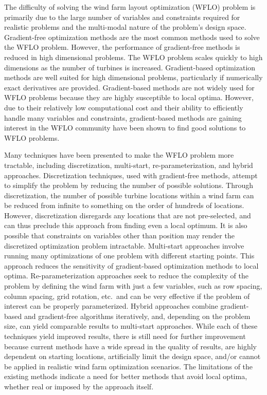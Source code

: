 \documentclass[hidelinks,sort&compress,AMA,STIX1COL]{WileyNJD-v2}
\begin{document}
The difficulty of solving the wind farm layout optimization (WFLO) problem is primarily due to the large number of variables and constraints required for realistic problems and the multi-modal nature of the problem's design space. Gradient-free optimization methods are the most common methods used to solve the WFLO problem. However, the performance of gradient-free methods is reduced in high dimensional problems\cite{rios2013-grad-free-comparison}. The WFLO problem scales quickly to high dimensions as the number of turbines is increased. Gradient-based optimization methods are well suited for high dimensional problems, particularly if numerically exact derivatives are provided. Gradient-based methods are not widely used for WFLO problems because they are highly susceptible to local optima\cite{acero2014}. However, due to their relatively low computational cost and their ability to efficiently handle many variables and constraints, gradient-based methods are gaining interest in the WFLO community have been shown to find good solutions to WFLO problems\cite{fleming2015,guirguis2016,gebraad2017-Maximization-Annual,baker2019,thomas2019-les-validation}.  

Many techniques have been presented to make the WFLO problem more tractable, including discretization, multi-start, re-parameterization, and hybrid approaches. Discretization techniques, used with gradient-free methods, attempt to simplify the problem by reducing the number of possible solutions\cite{mosetti1994, grady2005}. Through discretization, the number of possible turbine locations within a wind farm can be reduced from infinite to something on the order of hundreds of locations. However, discretization disregards any locations that are not pre-selected, and can thus preclude this approach from finding even a local optimum. It is also possible that constraints on variables other than position may render the discretized optimization problem intractable. Multi-start approaches involve running many optimizations of one problem with different starting points\cite{gonzalez2014,stanley2019-hub-height,thomas2018-wec,thomas2019-les-validation}. This approach reduces the sensitivity of gradient-based optimization methods to local optima. Re-parameterization approaches seek to reduce the complexity of the problem by defining the wind farm with just a few variables, such as row spacing, column spacing, grid rotation, etc.~and can be very effective if the problem of interest can be properly parameterized\cite{stanley2020}. Hybrid approaches combine gradient-based and gradient-free algorithms iteratively\cite{rethore2014,graf2016, mittal2017}, and, depending on the problem size, can yield comparable results to multi-start approaches\cite{rethore2014}. While each of these techniques yield improved results, there is still need for further improvement because current methods have a wide spread in the quality of results, are highly dependent on starting locations, artificially limit the design space, and/or cannot be applied in realistic wind farm optimization scenarios. The limitations of the existing methods indicate a need for better methods that avoid local optima, whether real or imposed by the approach itself.
\end{document}
